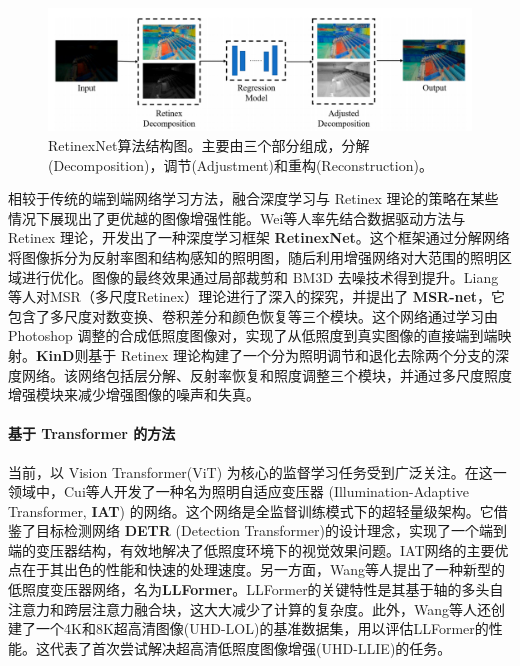 \documentclass[a4paper, 10pt]{article}
\begin{document}
	\begin{figure}[htb]
		\centering 
		\includegraphics[width=0.7\columnwidth]{picture/LLIE/RetinexNet/RetinexNet}
		\caption{
			\label{fig: RetinexNet} 
			RetinexNet算法结构图。主要由三个部分组成，分解(Decomposition)，调节(Adjustment)和重构(Reconstruction)。
		}
	\end{figure}
	
	相较于传统的端到端网络学习方法，融合深度学习与 Retinex 理论的策略在某些情况下展现出了更优越的图像增强性能。Wei等人\cite{wei2018deep}率先结合数据驱动方法与 Retinex 理论，开发出了一种深度学习框架 \textbf{RetinexNet}。这个框架通过分解网络将图像拆分为反射率图和结构感知的照明图，随后利用增强网络对大范围的照明区域进行优化。图像的最终效果通过局部裁剪和 BM3D 去噪技术得到提升。Liang等人\cite{shen2017msr}对MSR（多尺度Retinex）理论进行了深入的探究，并提出了 \textbf{MSR-net}，它包含了多尺度对数变换、卷积差分和颜色恢复等三个模块。这个网络通过学习由 Photoshop 调整的合成低照度图像对，实现了从低照度到真实图像的直接端到端映射。\textbf{KinD}\cite{zhang2019kindling}则基于 Retinex 理论构建了一个分为照明调节和退化去除两个分支的深度网络。该网络包括层分解、反射率恢复和照度调整三个模块，并通过多尺度照度增强模块来减少增强图像的噪声和失真。
	
	\paragraph{基于 Transformer 的方法}
	
	当前，以 Vision Transformer(ViT) 为核心的监督学习任务受到广泛关注。在这一领域中，Cui等人\cite{cui2022illumination}开发了一种名为照明自适应变压器 (Illumination-Adaptive Transformer, \textbf{IAT}) 的网络。这个网络是全监督训练模式下的超轻量级架构。它借鉴了目标检测网络 \textbf{DETR} (Detection Transformer)的设计理念\cite{carion2020end}，实现了一个端到端的变压器结构，有效地解决了低照度环境下的视觉效果问题。IAT网络的主要优点在于其出色的性能和快速的处理速度。另一方面，Wang等人\cite{wang2023ultra}提出了一种新型的低照度变压器网络，名为\textbf{LLFormer}。LLFormer的关键特性是其基于轴的多头自注意力和跨层注意力融合块，这大大减少了计算的复杂度。此外，Wang等人还创建了一个4K和8K超高清图像(UHD-LOL)的基准数据集，用以评估LLFormer的性能。这代表了首次尝试解决超高清低照度图像增强(UHD-LLIE)的任务。
	
\end{document}
